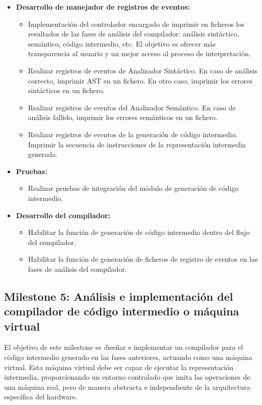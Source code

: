 \begin{itemize}
    \item \textbf{Desarrollo de manejador de registros de eventos:}
    \begin{itemize}
        \item Implementación del controlador encargado de imprimir en ficheros los resultados de las fases de análisis del compilador: análisis sintáctico, semántico, código intermedio, etc. El objetivo es ofrecer más transparencia al usuario y un mejor acceso al proceso de interpretación.
        \item Realizar registros de eventos de Analizador Sintáctico. En caso de análisis correcto, imprimir AST en un fichero. En otro caso, imprimir los errores sintácticos en un fichero.
        \item Realizar registros de eventos del Analizador Semántico. En caso de análisis fallido, imprimir los errores semánticos en un fichero.
        \item Realizar registros de eventos de la generación de código intermedio. Imprimir la secuencia de instrucciones de la representación intermedia generada.
    \end{itemize}

    \item \textbf{Pruebas:}
    \begin{itemize}
        \item Realizar pruebas de integración del módulo de generación de código intermedio.
    \end{itemize}

    \item \textbf{Desarrollo del compilador:}
    \begin{itemize}
        \item Habilitar la función de generación de código intermedio dentro del flujo del compilador.
        \item Habilitar la función de generación de ficheros de registro de eventos en las fases de análisis del compilador.
    \end{itemize}
\end{itemize}

\subsection{Milestone 5: Análisis e implementación del compilador de código intermedio o máquina virtual}
El objetivo de este milestone es diseñar e implementar un compilador para el código intermedio generado en las fases anteriores, actuando como una máquina virtual. Esta máquina virtual debe ser capaz de ejecutar la representación intermedia, proporcionando un entorno controlado que imita las operaciones de una máquina real, pero de manera abstracta e independiente de la arquitectura específica del hardware.

